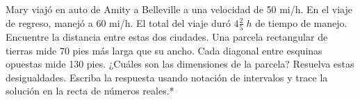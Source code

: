 \documentclass{exam}[letterpaper,10pt]
\begin{document}
\begin{multicols}{2}
\begin{questions}
    \question \textnormal{Mary viaj\'o en auto de Amity a Belleville a una velocidad de 50 mi/h. En el viaje de regreso, manej\'o a 60 mi/h. El total del viaje dur\'o \(4\frac{2}{5}\;\si{h}\) de tiempo de manejo. Encuentre la distancia entre estas dos ciudades.}
    \question \textnormal{Una parcela rectangular de tierras mide 70 pies m\'as larga que su ancho. Cada diagonal entre esquinas opuestas mide 130 pies. ¿Cu\'ales son las dimensiones de la parcela?}
    \question \textnormal{Resuelva estas desigualdades. Escriba la respuesta usando notaci\'on de intervalos y trace la soluci\'on en la recta de n\'umeros reales.*}
\end{questions}
\end{multicols}
\end{document}
